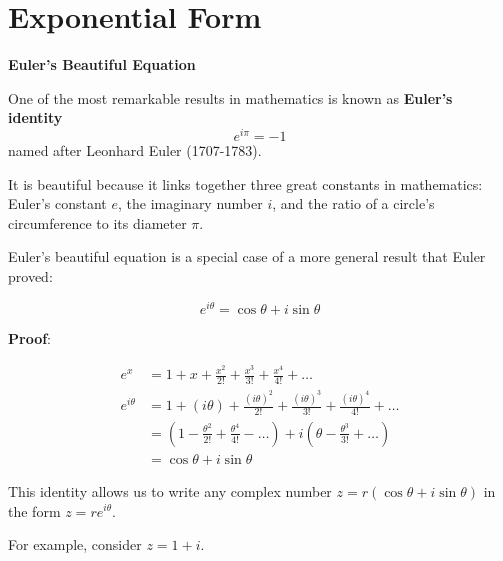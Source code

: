 \documentclass[11pt,a4paper]{book}
\begin{document}
\newpage

\section{Exponential Form}

\begin{tcolorbox}[colback=blue!5, colframe=black, boxrule=.4pt, sharpish corners]

\begin{tcolorbox}[skin=enhancedlast, width=\textwidth, interior style={left color=blue!5,right color=blue!35}, colframe=blue!35, arc=3mm, sharp corners=east,halign=right]

\textbf{\large{}Euler's Beautiful Equation}{\large\par}

\end{tcolorbox}

\medskip{}

One of the most remarkable results in mathematics is known as \textbf{Euler's identity}
\[
e^{i\pi}=-1
\]
named after Leonhard Euler (1707-1783).

\medskip{}

It is beautiful because it links together three great constants in
mathematics: Euler's constant $e$, the imaginary number $i$, and
the ratio of a circle's circumference to its diameter $\pi$.
\end{tcolorbox}
Euler's beautiful equation is a special case of a more general result
that Euler proved:

\[
e^{i\theta}=\cos\theta+i\sin\theta
\]

\textbf{Proof}:

\begin{align*}
e^{x} & =1+x+\frac{x^{2}}{2!}+\frac{x^{3}}{3!}+\frac{x^{4}}{4!}+\ldots\\
e^{i\theta} & =1+\left(i\theta\right)+\frac{\left(i\theta\right)^{2}}{2!}+\frac{\left(i\theta\right)^{3}}{3!}+\frac{\left(i\theta\right)^{4}}{4!}+\ldots\\
 & =\left(1-\frac{\theta^{2}}{2!}+\frac{\theta^{4}}{4!}-\ldots\right)+i\left(\theta-\frac{\theta^{3}}{3!}+\ldots\right)\\
 & =\cos\theta+i\sin\theta
\end{align*}

This identity allows us to write any complex number $z=r\left(\cos\theta+i\sin\theta\right)$
in the form $z=re^{i\theta}$.

For example, consider $z=1+i$.
\end{document}
